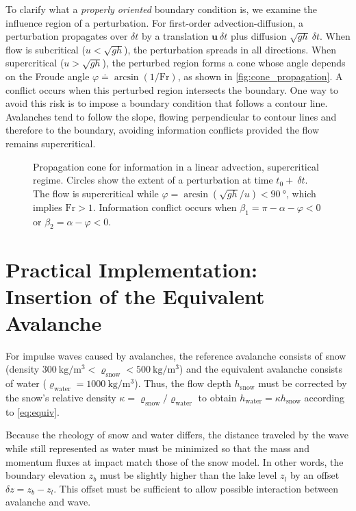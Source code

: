 \documentclass[11pt]{article}
\begin{document}
To clarify what a \emph{properly oriented} boundary condition is, we examine the influence region of a perturbation.
For first-order advection-diffusion, a perturbation propagates over $\delta t$ by a translation $\bm u ~\delta t$ plus diffusion $\sqrt{gh} ~\delta t$.
When flow is subcritical ($u<\sqrt{gh}$), the perturbation spreads in all directions.
When supercritical ($u>\sqrt{gh}$), the perturbed region forms a cone whose angle depends on the Froude angle $\varphi\doteq\arcsin(1/\mathrm{Fr})$, as shown in \autoref{fig:cone_propagation}.
A conflict occurs when this perturbed region intersects the boundary.
One way to avoid this risk is to impose a boundary condition that follows a contour line.
Avalanches tend to follow the slope, flowing perpendicular to contour lines and therefore to the boundary, avoiding information conflicts provided the flow remains supercritical.

\begin{figure}
    \centering
    
    \caption{Propagation cone for information in a linear advection, supercritical regime. Circles show the extent of a perturbation at time $t_0+~\delta t$. The flow is supercritical while $\varphi=\arcsin\left(\sqrt{gh}/u\right)<\SI{90}{\degree}$, which implies $\mathrm{Fr}>1$.
    Information conflict occurs when $\beta_1=\pi-\alpha-\varphi<0$ or $\beta_2=\alpha-\varphi<0$.}
    \label{fig:cone_propagation}
\end{figure}

\section{Practical Implementation:\\Insertion of the Equivalent Avalanche}

For impulse waves caused by avalanches, the reference avalanche consists of snow (density $\SI{300}{\kilo\gram\per\meter\cubed}<\varrho_\text{snow}<\SI{500}{\kilo\gram\per\meter\cubed}$) and the equivalent avalanche consists of water ($\varrho_\text{water}=\SI{1000}{\kilo\gram\per\meter\cubed}$).
Thus, the flow depth $h_\text{snow}$ must be corrected by the snow's relative density $\kappa=\varrho_\text{snow}/\varrho_\text{water}$ to obtain $h_\text{water}=\kappa h_\text{snow}$ according to \autoref{eq:equiv}.

Because the rheology of snow and water differs, the distance traveled by the wave while still represented as water must be minimized so that the mass and momentum fluxes at impact match those of the snow model.
In other words, the boundary elevation $z_b$ must be slightly higher than the lake level $z_l$ by an offset $\delta z=z_b-z_l$.
This offset must be sufficient to allow possible interaction between avalanche and wave.
\end{document}
